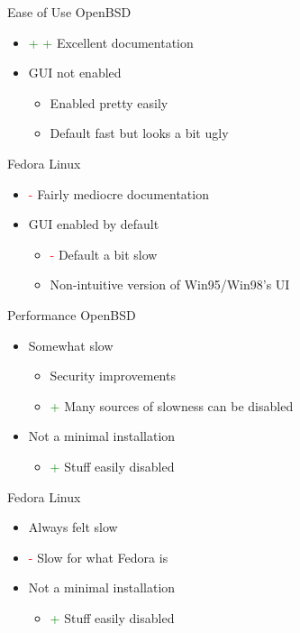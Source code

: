 \documentclass{beamer}
\newcommand{\good}{\textcolor{green}{+ }}
\newcommand{\bad}{\textcolor{red}{- }}
\begin{document}
			\begin{frame}{Ease of Use}
				OpenBSD
				\begin{itemize}
					\item \good \good Excellent documentation
					\item GUI not enabled
					\begin{itemize}
						\item Enabled pretty easily
						\item Default fast but looks a bit ugly
					\end{itemize}
				\end{itemize}
				Fedora Linux
				\begin{itemize}
					\item \bad Fairly mediocre documentation
					\item GUI enabled by default
					\begin{itemize}
						\item \bad Default a bit slow
						\item Non-intuitive version of Win95/Win98's UI
					\end{itemize}
				\end{itemize}
			\end{frame}
			\begin{frame}{Performance}
				OpenBSD
				\begin{itemize}
					\item Somewhat slow
					\begin{itemize}
						\item Security improvements
						\item \good Many sources of slowness can be disabled
					\end{itemize}
					\item Not a minimal installation
					\begin{itemize}
						\item \good Stuff easily disabled
					\end{itemize}
				\end{itemize}
				Fedora Linux
				\begin{itemize}
					\item Always felt slow
					\item \bad Slow for what Fedora is
					\item Not a minimal installation
					\begin{itemize}
						\item \good Stuff easily disabled
					\end{itemize}
				\end{itemize}
			\end{frame}
\end{document}
